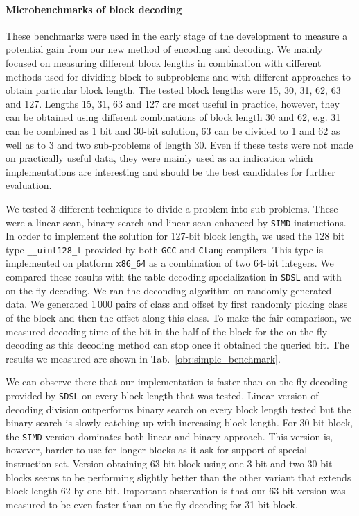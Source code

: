\paragraph{Microbenchmarks of block decoding}

These benchmarks were used in the early stage of the development to measure a potential gain from
our new method of encoding and decoding. We mainly focused on measuring different block lengths
in combination with different methods used for dividing block to subproblems and with different
approaches to obtain particular block length. The tested block lengths were 15, 30, 31, 62, 63
and 127. Lengths 15, 31, 63 and 127 are most useful in practice, however, they can be obtained using
different combinations of block length 30 and 62, e.g. 31 can be combined as 1 bit and 30-bit solution,
63 can be divided to 1 and 62 as well as to 3 and two sub-problems of length 30. Even if these
tests were not made on practically useful data, they were mainly used as an indication which
implementations are interesting and should be the best candidates for further evaluation.

We tested 3 different techniques to divide a problem into sub-problems. These were a linear scan,
binary search and linear scan enhanced by \texttt{SIMD} instructions. In order to implement the
solution for 127-bit block length, we used the 128 bit type \texttt{\_\_uint128\_t} provided by both
\texttt{GCC} and \texttt{Clang} compilers. This type is implemented on platform \texttt{x86\_64}
as a combination of two 64-bit integers. We compared these results with the table decoding specialization
in \texttt{SDSL} and with on-the-fly decoding. We ran the deconding algorithm on randomly generated data.
We generated 1\,000 pairs of class and offset by first randomly picking class of the block and then the
offset along this class. To make the fair comparison, we measured decoding time of the bit in the half of
the block for the on-the-fly decoding as this decoding method can stop once it obtained the queried bit.
The results we measured are shown in Tab.~\ref{obr:simple_benchmark}.

We can observe there that our implementation is faster than on-the-fly decoding provided by \texttt{SDSL}
on every block length that was tested. Linear version of decoding division outperforms binary search on
every block length tested but the binary search is slowly catching up with increasing block length.
For 30-bit block, the \texttt{SIMD} version dominates both linear and binary approach. This version is,
however, harder to use for longer blocks as it ask for support of special instruction set. Version
obtaining 63-bit block using one 3-bit and two 30-bit blocks seems to be performing slightly better than
the other variant that extends block length 62 by one bit. Important observation is that our 63-bit
version was measured to be even faster than on-the-fly decoding for 31-bit block.

